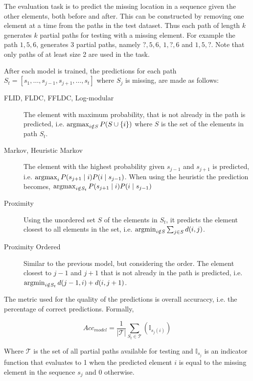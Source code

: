 The evaluation task is to predict the missing location in a sequence given the other elements, both before and after. This can be constructed by removing one element at a time from the paths in the test dataset. Thus each path of length $k$ generates $k$ partial paths for testing with a missing element. For example the path $1,5,6$, generates 3 partial paths, namely $?,5,6$, $1,?,6$ and $1,5,?$. Note that only paths of at least size 2 are used in the task.

After each model is trained, the predictions for each path $S_{t} = [s_{1}, \dots, s_{j-1}, s_{j+1}, \dots, s_{t}]$ where $S_{j}$ is missing, are made as follows:

\begin{description}
  \item[FLID, FLDC, FFLDC, Log-modular] The element with maximum probability, that is not already in the path is predicted, i.e. $\operatorname*{argmax}_{i \notin S} P(S \cup \{i\})$ where $S$ is the set of the elements in path $S_{t}$.
  \item[Markov, Heuristic Markov] The element with the highest probability given $s_{j-1}$ and $s_{j+1}$ is predicted, i.e. $\operatorname*{argmax}_{i} P(s_{j+1} \mid i)P(i \mid s_{j-1})$. When using the heuristic the prediction becomes, $\operatorname*{argmax}_{i \notin S_{t}} P(s_{j+1} \mid i)P(i \mid s_{j-1})$
  \item[Proximity] Using the unordered set $S$ of the elements in $S_{t}$, it predicts the element closest to all elements in the set, i.e. $\operatorname*{argmin}_{i \notin S} \sum_{j \in S}d(i, j)$.
  \item[Proximity Ordered] Similar to the previous model, but considering the order. The element closest to $j-1$ and $j+1$ that is not already in the path is predicted, i.e. $\operatorname*{argmin}_{i \notin S_{t}}d(j-1, i) + d(i, j+1)$.
\end{description}

The metric used for the quality of the predictions is overall accuraccy, i.e. the percentage of correct predictions. Formally, 

\begin{equation}
  Acc_{model} = \frac{1}{|\mathcal{T}|}\sum_{S_{t} \in \mathcal{T}}(\mathbb{I}_{s_{j}(i)})
\end{equation}

Where $\mathcal{T}$ is the set of all partial paths available for testing and $\mathbb{I}_{s_{j}}$ is an indicator function that evaluates to 1 when the predicted element $i$ is equal to the missing element in the sequence $s_{j}$ and 0 otherwise.

